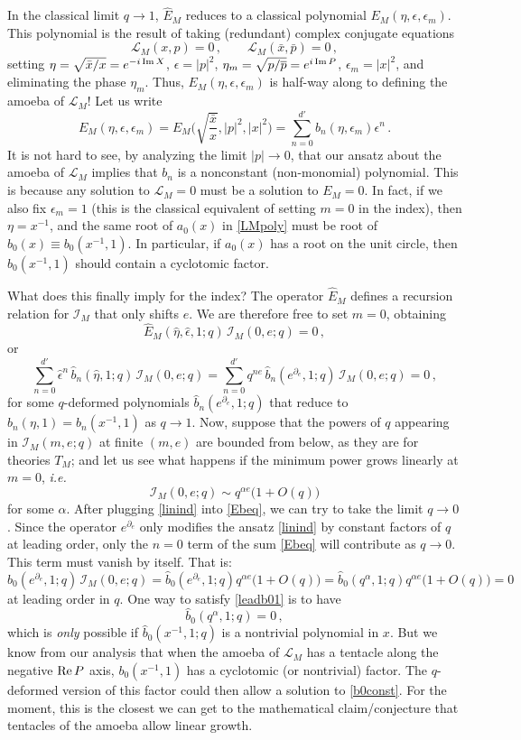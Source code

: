 \documentclass[11pt,letterpaper]{article}
\numberwithin{equation}{section}
\newcommand{\be}{\begin{equation}}
\newcommand{\ee}{\end{equation}}
\newcommand{\ol}{\overline}
\newcommand{\ie}{\emph{i.e.}}
\renewcommand{\Re}{{\rm Re}}
\renewcommand{\Im}{{\rm Im}}
\newcommand{\pd}{\partial}
\newcommand{\CI}{\mathcal{I}}
\newcommand{\CL}{\mathcal{L}}
\begin{document}
In the classical limit $q\to 1$, $\hat E_M$ reduces to a classical polynomial $E_M(\eta,\epsilon,\epsilon_m)$. This polynomial is the result of taking (redundant) complex conjugate equations
%
\be \CL_M(x,p) = 0\,,\qquad \CL_M(\bar x,\bar p) = 0\,, \ee
%
setting $\eta = \sqrt{\bar x/x} = e^{-i\,\Im\,X}$, $\epsilon = |p|^2$, $\eta_m = \sqrt{p/\ol p}= e^{i\,\Im\,P}$, $\epsilon_m = |x|^2$, and eliminating the phase $\eta_m$. Thus, $E_M(\eta,\epsilon,\epsilon_m)$ is half-way along to defining the amoeba of $\CL_M$! Let us write
%
\be E_M(\eta,\epsilon,\epsilon_m) = E_M\Big(\sqrt{\frac{\bar x}{x}},|p|^2,|x|^2\Big) = \sum_{n=0}^{d'} b_n(\eta,\epsilon_m)\epsilon^n\,.\ee
%
It is not hard to see, by analyzing the limit $|p|\to 0$, that our ansatz about the amoeba of $\CL_M$ implies that $b_n$ is a nonconstant (non-monomial) polynomial. This is because any solution to $\CL_M=0$ must be a solution to $E_M=0$. In fact, if we also fix $\epsilon_m =1$ (this is the classical equivalent of setting $m=0$ in the index), then $\eta = x^{-1}$, and the same root of $a_0(x)$ in \eqref{LMpoly} must be root of $b_0(x) \equiv b_0(x^{-1},1)$. In particular, if $a_0(x)$ has a root on the unit circle, then $b_0(x^{-1},1)$ should contain a cyclotomic factor.

What does this finally imply for the index? The operator $\hat E_M$ defines a recursion relation for $\CI_M$ that only shifts $e$. We are therefore free to set $m=0$, obtaining
%
\be \hat E_M(\hat \eta,\hat\epsilon,1;q)\,\CI_M(0,e;q) = 0\,, \ee
%
or
%
\be \sum_{n=0}^{d'}  \hat\epsilon^n\, \hat b_n(\hat\eta,1;q)\,\CI_M(0,e;q) = \sum_{n=0}^{d'} q^{ne}\,\hat b_n(e^{\pd_e},1;q)\,\CI_M(0,e;q)=0\,, \label{Ebeq}\ee
%
for some $q$-deformed polynomials $\hat b_n(e^{\pd_e},1;q)$ that reduce to $b_n(\eta,1)=b_n(x^{-1},1)$ as $q\to 1$. Now, suppose that the powers of $q$ appearing in $\CI_M(m,e;q)$ at finite $(m,e)$ are bounded from below, as they are for theories $T_M$; and let us see what happens if the minimum power grows linearly at $m=0$, \ie\
%
\be \CI_M(0,e;q) \sim q^{\alpha e}\big(1+O(q)\big) \label{linind} \ee
%
for some $\alpha$. After plugging \eqref{linind} into \eqref{Ebeq}, we can try to take the limit $q\to 0$. Since the operator $e^{\pd_e}$ only modifies the ansatz \eqref{linind} by constant factors of $q$ at leading order, only the $n=0$ term of the sum \eqref{Ebeq} will contribute as $q\to 0$. This term must vanish by itself. That is:
%
\be \hat b_0(e^{\pd_e},1;q)\,\CI_M(0,e;q) = \hat b_0(e^{\pd_e},1;q) q^{\alpha e}\big(1+O(q)\big)  = \hat b_0(q^\alpha,1;q)q^{\alpha e}\big(1+O(q)\big) = 0 \label{leadb01} \ee
%
at leading order in $q$. One way to satisfy \eqref{leadb01} is to have
%
\be \boxed{\hat b_0(q^\alpha,1;q)=0}\,, \label{b0const} \ee
%
which is \emph{only} possible if $\hat b_0(x^{-1},1;q)$ is a nontrivial polynomial in $x$. But we know from our analysis that when the amoeba of $\CL_M$ has a tentacle along the negative $\Re\,P$ axis, $b_0(x^{-1},1)$ has a cyclotomic (or nontrivial) factor. The $q$-deformed version of this factor could then allow a solution to \eqref{b0const}. For the moment, this is the closest we can get to the mathematical claim/conjecture that tentacles of the amoeba allow linear growth.
\end{document}
